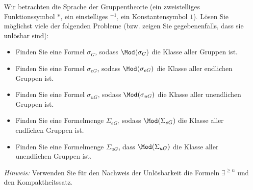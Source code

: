 
\begin{exercise}[128]

Wir betrachten die Sprache der Gruppentheorie (ein zweistelliges Funktionssymbol $*$,
ein einstelliges $^{-1}$, ein Konstantensymbol $1$). Lösen Sie möglichst viele
der folgenden Probleme (bzw. zeigen Sie gegebenenfalls, dass sie unlösbar sind):
\begin{itemize}
  \item Finden Sie eine Formel $\sigma_G$, sodass $\Mod(\sigma_G)$ die Klasse
  aller Gruppen ist.
  \item Finden Sie eine Formel $\sigma_{eG}$, sodass $\Mod(\sigma_{eG})$ die
  Klasse aller endlichen Gruppen ist.
  \item Finden Sie eine Formel $\sigma_{uG}$, sodass $\Mod(\sigma_{uG})$ die Klasse
  aller unendlichen Gruppen ist.
  \item Finden Sie eine Formelmenge $\Sigma_{eG}$, sodass $\Mod(\Sigma_{eG})$ die
  Klasse aller endlichen Gruppen ist.
  \item Finden Sie eine Formelmenge $\Sigma_{uG}$, dass $\Mod(\Sigma_{uG})$ die
  Klasse aller unendlichen Gruppen ist.
\end{itemize}
\textit{Hinweis:} Verwenden Sie für den Nachweis der Unlösbarkeit die Formeln
$\exists^{\geq n}$ und den Kompaktheitssatz.
\end{exercise}


\begin{solution}

\phantom{}

\end{solution}

